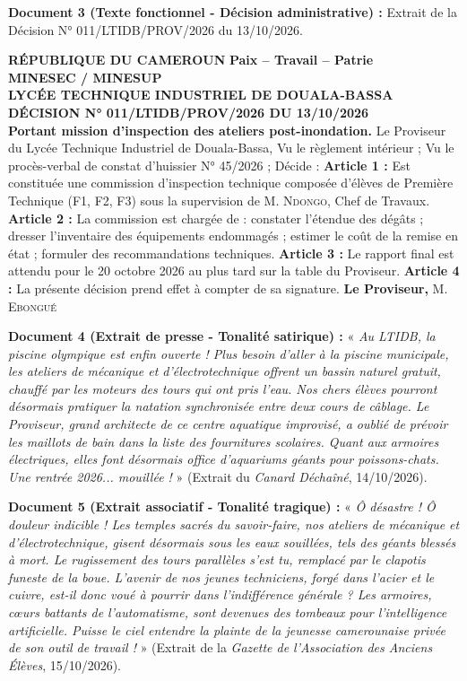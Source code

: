 \documentclass[11pt]{article}
\begin{document}
\textbf{Document 3 (Texte fonctionnel - Décision administrative) :} Extrait de la Décision N° 011/LTIDB/PROV/2026 du 13/10/2026.
\begin{exemplebox}
\textbf{RÉPUBLIQUE DU CAMEROUN} \hfill \textbf{Paix – Travail – Patrie} \\
\textbf{MINESEC / MINESUP} \\
\textbf{LYCÉE TECHNIQUE INDUSTRIEL DE DOUALA-BASSA} \\
\textbf{DÉCISION N° 011/LTIDB/PROV/2026 DU 13/10/2026} \\
\textbf{Portant mission d'inspection des ateliers post-inondation.}
Le Proviseur du Lycée Technique Industriel de Douala-Bassa,
Vu le règlement intérieur ; Vu le procès-verbal de constat d'huissier N° 45/2026 ;
Décide :
\textbf{Article 1 :} Est constituée une commission d'inspection technique composée d'élèves de Première Technique (F1, F2, F3) sous la supervision de M. \textsc{Ndongo}, Chef de Travaux.
\textbf{Article 2 :} La commission est chargée de : constater l'étendue des dégâts ; dresser l'inventaire des équipements endommagés ; estimer le coût de la remise en état ; formuler des recommandations techniques.
\textbf{Article 3 :} Le rapport final est attendu pour le 20 octobre 2026 au plus tard sur la table du Proviseur.
\textbf{Article 4 :} La présente décision prend effet à compter de sa signature.
\vspace{0.5em}
\hfill \textbf{Le Proviseur,} \hspace{2cm} M. \textsc{Ebongué}
\end{exemplebox}

\textbf{Document 4 (Extrait de presse - Tonalité satirique) :} « \emph{Au LTIDB, la piscine olympique est enfin ouverte ! Plus besoin d'aller à la piscine municipale, les ateliers de mécanique et d'électrotechnique offrent un bassin naturel gratuit, chauffé par les moteurs des tours qui ont pris l'eau. Nos chers élèves pourront désormais pratiquer la natation synchronisée entre deux cours de câblage. Le Proviseur, grand architecte de ce centre aquatique improvisé, a oublié de prévoir les maillots de bain dans la liste des fournitures scolaires. Quant aux armoires électriques, elles font désormais office d'aquariums géants pour poissons-chats. Une rentrée 2026... mouillée ! }» (Extrait du \emph{Canard Déchaîné}, 14/10/2026).

\textbf{Document 5 (Extrait associatif - Tonalité tragique) :} « \emph{Ô désastre ! Ô douleur indicible ! Les temples sacrés du savoir-faire, nos ateliers de mécanique et d'électrotechnique, gisent désormais sous les eaux souillées, tels des géants blessés à mort. Le rugissement des tours parallèles s'est tu, remplacé par le clapotis funeste de la boue. L'avenir de nos jeunes techniciens, forgé dans l'acier et le cuivre, est-il donc voué à pourrir dans l'indifférence générale ? Les armoires, cœurs battants de l'automatisme, sont devenues des tombeaux pour l'intelligence artificielle. Puisse le ciel entendre la plainte de la jeunesse camerounaise privée de son outil de travail ! }» (Extrait de la \emph{Gazette de l'Association des Anciens Élèves}, 15/10/2026).
\end{document}
